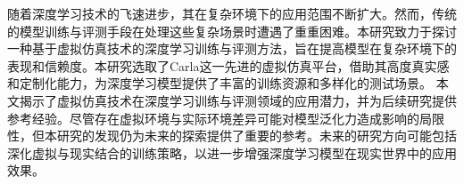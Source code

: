 \begin{abstractzh}


    随着深度学习技术的飞速进步，其在复杂环境下的应用范围不断扩大。然而，传统的模型训练与评测手段在处理这些复杂场景时遭遇了重重困难。本研究致力于探讨一种基于虚拟仿真技术的深度学习训练与评测方法，旨在提高模型在复杂环境下的表现和信赖度。本研究选取了Carla这一先进的虚拟仿真平台，借助其高度真实感和定制化能力，为深度学习模型提供了丰富的训练资源和多样化的测试场景。
    本文揭示了虚拟仿真技术在深度学习训练与评测领域的应用潜力，并为后续研究提供参考经验。尽管存在虚拟环境与实际环境差异可能对模型泛化力造成影响的局限性，但本研究的发现仍为未来的探索提供了重要的参考。未来的研究方向可能包括深化虚拟与现实结合的训练策略，以进一步增强深度学习模型在现实世界中的应用效果。
    


\end{abstractzh}